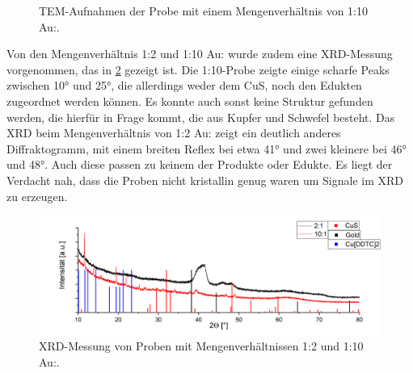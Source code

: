 	\begin{figure}[H]
		\centering
		\caption{TEM-Aufnahmen der Probe mit einem Mengenverhältnis von 1:10 Au:.}
		\label{fig:TEM-CuAu-10-1}
	\end{figure}
	
	Von den Mengenverhältnis 1:2 und 1:10 Au: wurde zudem eine XRD-Messung vorgenommen, das in \cref{fig:XRD} gezeigt ist.
	Die 1:10-Probe zeigte einige scharfe Peaks zwischen 10° und 25°, die allerdings weder dem CuS, noch den Edukten zugeordnet werden können.
	Es konnte auch sonst keine Struktur gefunden werden, die hierfür in Frage kommt, die aus Kupfer und Schwefel besteht.
	Das XRD beim  Mengenverhältnis von 1:2 Au: zeigt ein deutlich anderes Diffraktogramm, mit einem breiten Reflex bei etwa 41° und zwei kleinere bei 46° und 48°. Auch diese passen zu keinem der Produkte oder Edukte.
	Es liegt der Verdacht nah, dass die Proben nicht kristallin genug waren um Signale im XRD zu erzeugen.
	
	\begin{figure}[H]
		\centering
		\includegraphics[width=\textwidth]{Bilder/XRD-CuS} 	
		\caption{XRD-Messung von Proben mit Mengenverhältnissen 1:2 und 1:10 Au:.}
		\label{fig:XRD}
	\end{figure}
	
